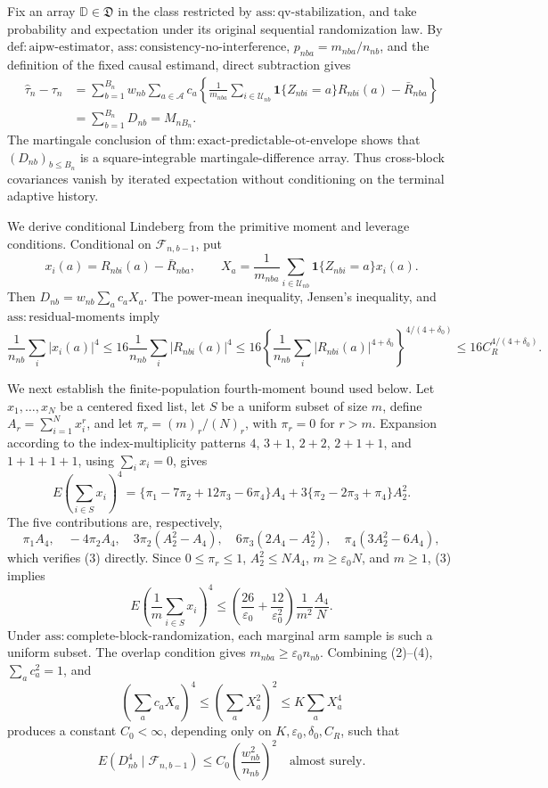 Fix an array \(\mathbb D\in\mathfrak D\) in the class restricted by \(\mathrm{ass:qv\text{-}stabilization}\), and take probability and expectation under its original sequential randomization law. By \(\mathrm{def:aipw\text{-}estimator}\), \(\mathrm{ass:consistency\text{-}no\text{-}interference}\), \(p_{nba}=m_{nba}/n_{nb}\), and the definition of the fixed causal estimand, direct subtraction gives
\[
\begin{aligned}
\widehat\tau_n-\tau_n
&=\sum_{b=1}^{B_n}w_{nb}\sum_{a\in\mathcal A}c_a
\left\{\frac1{m_{nba}}\sum_{i\in\mathcal U_{nb}}
\mathbf1\{Z_{nbi}=a\}R_{nbi}(a)-\bar R_{nba}\right\}\\
&=\sum_{b=1}^{B_n}D_{nb}=M_{nB_n}.
\end{aligned}
\tag{1}
\]
The martingale conclusion of \(\mathrm{thm:exact\text{-}predictable\text{-}ot\text{-}envelope}\) shows that \((D_{nb})_{b\le B_n}\) is a square-integrable martingale-difference array. Thus cross-block covariances vanish by iterated expectation without conditioning on the terminal adaptive history.

We derive conditional Lindeberg from the primitive moment and leverage conditions. Conditional on \(\mathcal F_{n,b-1}\), put
\[
x_i(a)=R_{nbi}(a)-\bar R_{nba},
\qquad
X_a=\frac1{m_{nba}}\sum_{i\in\mathcal U_{nb}}
\mathbf1\{Z_{nbi}=a\}x_i(a).
\]
Then \(D_{nb}=w_{nb}\sum_ac_aX_a\). The power-mean inequality, Jensen's inequality, and \(\mathrm{ass:residual\text{-}moments}\) imply
\[
\frac1{n_{nb}}\sum_i|x_i(a)|^4
\le16\frac1{n_{nb}}\sum_i|R_{nbi}(a)|^4
\le16\left\{\frac1{n_{nb}}\sum_i|R_{nbi}(a)|^{4+\delta_0}\right\}^{4/(4+\delta_0)}
\le16C_R^{4/(4+\delta_0)}.
\tag{2}
\]

We next establish the finite-population fourth-moment bound used below. Let \(x_1,\ldots,x_N\) be a centered fixed list, let \(S\) be a uniform subset of size \(m\), define \(A_r=\sum_{i=1}^Nx_i^r\), and let \(\pi_r=(m)_r/(N)_r\), with \(\pi_r=0\) for \(r>m\). Expansion according to the index-multiplicity patterns \(4\), \(3+1\), \(2+2\), \(2+1+1\), and \(1+1+1+1\), using \(\sum_ix_i=0\), gives
\[
E\left(\sum_{i\in S}x_i\right)^4
=\{\pi_1-7\pi_2+12\pi_3-6\pi_4\}A_4
+3\{\pi_2-2\pi_3+\pi_4\}A_2^2.
\tag{3}
\]
The five contributions are, respectively,
\[
\pi_1A_4,\quad -4\pi_2A_4,\quad
3\pi_2(A_2^2-A_4),\quad
6\pi_3(2A_4-A_2^2),\quad
\pi_4(3A_2^2-6A_4),
\]
which verifies (3) directly. Since \(0\le\pi_r\le1\), \(A_2^2\le NA_4\), \(m\ge\varepsilon_0N\), and \(m\ge1\), (3) implies
\[
E\left(\frac1m\sum_{i\in S}x_i\right)^4
\le\left(\frac{26}{\varepsilon_0}+\frac{12}{\varepsilon_0^2}\right)
\frac1{m^2}\frac{A_4}{N}.
\tag{4}
\]
Under \(\mathrm{ass:complete\text{-}block\text{-}randomization}\), each marginal arm sample is such a uniform subset. The overlap condition gives \(m_{nba}\ge\varepsilon_0n_{nb}\). Combining (2)--(4), \(\sum_ac_a^2=1\), and
\[
\left(\sum_ac_aX_a\right)^4
\le\left(\sum_aX_a^2\right)^2
\le K\sum_aX_a^4
\]
produces a constant \(C_0<\infty\), depending only on \(K,\varepsilon_0,\delta_0,C_R\), such that
\[
E(D_{nb}^4\mid\mathcal F_{n,b-1})
\le C_0\left(\frac{w_{nb}^2}{n_{nb}}\right)^2
\quad\text{almost surely}.
\tag{5}
\]

